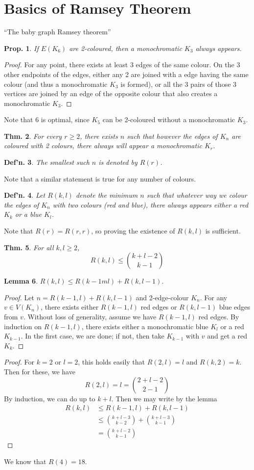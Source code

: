 \documentclass[12pt, a4paper]{book}
\newtheorem{theorem}{Thm.}[section]
\newtheorem{lemma}[theorem]{Lemma}
\newtheorem{definition}[theorem]{Def'n.}
\newtheorem{proposition}[theorem]{Prop.}
\theoremstyle{nonumberplain}
\newtheorem{proof}{Proof}
\begin{document}
\section{Basics of Ramsey Theorem}
``The baby graph Ramsey theorem''
\begin{proposition}
    If $E(K_6)$ are 2-coloured, then a monochromatic $K_3$ always appears.
\end{proposition}
\begin{proof}
    For any point, there exists at least 3 edges of the same colour.
    On the 3 other endpoints of the edges, either any 2 are joined with a edge having the same colour (and thus a monochromatic $K_3$ is formed), or all the 3 pairs of those 3 vertices are joined by an edge of the opposite colour that also creates a monochromatic $K_3$.
\end{proof}
Note that $6$ is optimal, since $K_5$ can be 2-coloured without a monochromatic $K_3$.
\begin{theorem}
    For every $r\geq 2$, there exists $n$ such that however the edges of $K_n$ are coloured with 2 colours, there always will appear a monochromatic $K_r$.
\end{theorem}
\begin{definition}
    The smallest such $n$ is denoted by $R(r)$.
\end{definition}
Note that a similar statement is true for any number of colours.
\begin{definition}
    Let $R(k,l)$ denote the minimum $n$ such that whatever way we colour the edges of $K_n$ with two colours (red and blue), there always appears either a red $K_k$ or a blue $K_l$.
\end{definition}
Note that $R(r)=R(r,r)$, so proving the existence of $R(k,l)$ is sufficient.
\begin{theorem}
    For all $k,l\geq 2$,
    \[R(k,l)\leq\binom{k+l-2}{k-1}\]
\end{theorem}
\begin{lemma}
    $R(k,l)\leq R(k-1ml)+R(k,l-1)$.
\end{lemma}
\begin{proof}
    Let $n=R(k-1,l)+R(k,l-1)$ and 2-edge-colour $K_n$.
    For any $v\in V(K_n)$, there exists either $R(k-1,l)$ red edges or $R(k,l-1)$ blue edges from $v$.
    Without loss of generality, assume we have $R(k-1,l)$ red edges.
    By induction on $R(k-1,l)$, there exists either a monochromatic blue $K_l$ or a red $K_{k-1}$.
    In the first case, we are done; if not, then take $K_{k-1}$ with $v$ and get a red $K_k$.
\end{proof}
\begin{proof}
    For $k=2$ or $l=2$, this holds easily that $R(2,l)=l$ and $R(k,2)=k$.
    Then for these, we have
    \[R(2,l)=l=\binom{2+l-2}{2-1}\]
    By induction, we can do up to $k+l$.
    Then we may write by the lemma
    \begin{align*}
        R(k,l) &\leq R(k-1,l)+R(k,l-1)\\
               &\leq \binom{k+l-3}{k-2}+\binom{k+l-3}{k-1}\\
               &= \binom{k+l-2}{k-1}
    \end{align*}
\end{proof}
We know that $R(4)=18$.
\end{document}

